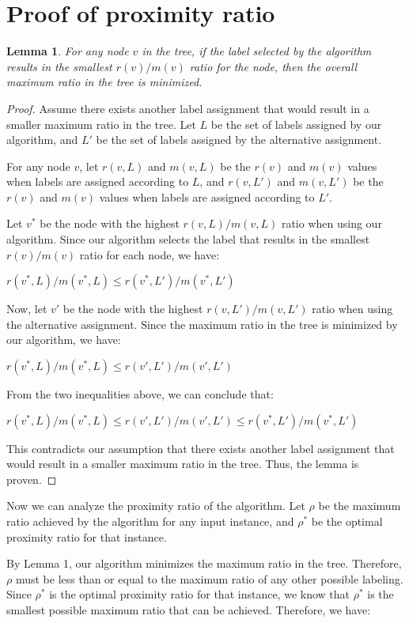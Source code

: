 \documentclass{article}
\newtheorem{lemma}{Lemma}
\begin{document}
\section{Proof of proximity ratio}
\begin{lemma}
For any node $v$ in the tree, if the label selected by the algorithm results in the smallest $r(v)/m(v)$ ratio for the node, then the overall maximum ratio in the tree is minimized.
\end{lemma}

\begin{proof}
Assume there exists another label assignment that would result in a smaller maximum ratio in the tree. Let $L$ be the set of labels assigned by our algorithm, and $L'$ be the set of labels assigned by the alternative assignment.

For any node $v$, let $r(v, L)$ and $m(v, L)$ be the $r(v)$ and $m(v)$ values when labels are assigned according to $L$, and $r(v, L')$ and $m(v, L')$ be the $r(v)$ and $m(v)$ values when labels are assigned according to $L'$.

Let $v^*$ be the node with the highest $r(v, L)/m(v, L)$ ratio when using our algorithm. Since our algorithm selects the label that results in the smallest $r(v)/m(v)$ ratio for each node, we have:

$r(v^*, L) / m(v^*, L) \leq r(v^*, L') / m(v^*, L')$

Now, let $v'$ be the node with the highest $r(v, L')/m(v, L')$ ratio when using the alternative assignment. Since the maximum ratio in the tree is minimized by our algorithm, we have:

$r(v^*, L) / m(v^*, L) \leq r(v', L') / m(v', L')$

From the two inequalities above, we can conclude that:

$r(v^*, L) / m(v^*, L) \leq r(v', L') / m(v', L') \leq r(v^*, L') / m(v^*, L')$

This contradicts our assumption that there exists another label assignment that would result in a smaller maximum ratio in the tree. Thus, the lemma is proven.
\end{proof}

Now we can analyze the proximity ratio of the algorithm. Let $\rho$ be the maximum ratio achieved by the algorithm for any input instance, and $\rho^*$ be the optimal proximity ratio for that instance.

By Lemma 1, our algorithm minimizes the maximum ratio in the tree. Therefore, $\rho$ must be less than or equal to the maximum ratio of any other possible labeling. Since $\rho^*$ is the optimal proximity ratio for that instance, we know that $\rho^*$ is the smallest possible maximum ratio that can be achieved. Therefore, we have:
\end{document}
